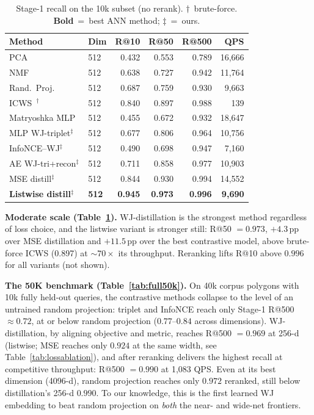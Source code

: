 \documentclass[sigconf]{acmart}
\begin{document}
\begin{table}[t]\centering
\caption{Stage-1 recall on the 10k subset (no rerank). $\dagger$~brute-force.
\textbf{Bold}~=~best ANN method; $\ddagger$~=~ours.}
\label{tab:results}\setlength{\tabcolsep}{4pt}\small
\begin{tabular}{@{}llrrrr@{}}
\toprule
Method & Dim & R@10 & R@50 & R@500 & QPS \\
\midrule
PCA~\cite{jolliffe02}                   & 512  & 0.432 & 0.553 & 0.789 & 16{,}666 \\
NMF~\cite{nmf99}                        & 512  & 0.638 & 0.727 & 0.942 & 11{,}764 \\
Rand.\ Proj.~\cite{achlioptas03}        & 512  & 0.687 & 0.759 & 0.930 &  9{,}663 \\
ICWS~\cite{ioffe10}$^\dagger$           & 512  & 0.840 & 0.897 & 0.988 &     139 \\
Matryoshka MLP~\cite{matryoshka22}      & 512  & 0.455 & 0.672 & 0.932 & 18{,}647 \\
\addlinespace[2pt]
MLP WJ-triplet$^\ddagger$               & 512  & 0.677 & 0.806 & 0.964 & 10{,}756 \\
InfoNCE--WJ$^\ddagger$                  & 512  & 0.490 & 0.698 & 0.947 &  7{,}160 \\
AE WJ-tri+recon$^\ddagger$              & 512  & 0.711 & 0.858 & 0.977 & 10{,}903 \\
MSE distill$^\ddagger$        & 512  & 0.844 & 0.930 & 0.994 & 14{,}552 \\
\textbf{Listwise distill}$^\ddagger$ & \textbf{512} & \textbf{0.945} & \textbf{0.973} & \textbf{0.996} & \textbf{9{,}690} \\
\bottomrule
\end{tabular}
\end{table}

\textbf{Moderate scale (Table~\ref{tab:results}).}
WJ-distillation is the strongest method regardless of loss choice, and the listwise
variant is stronger still: R@50 $=0.973$, $+4.3$\,pp over MSE distillation and
$+11.5$\,pp over the best contrastive model, above brute-force ICWS (0.897) at
${\sim}70\times$ its throughput. Reranking lifts R@10 above $0.996$ for all
variants (not shown).

\textbf{The 50K benchmark (Table~\ref{tab:full50k}).}
On 40k corpus polygons with 10k fully held-out queries, the contrastive methods
collapse to the level of an untrained random projection: triplet and InfoNCE reach
only Stage-1 R@500 $\approx 0.72$, at or below random projection ($0.77$--$0.84$
across dimensions). WJ-distillation, by aligning objective and metric, reaches
R@500 $=0.969$ at 256-d (listwise; MSE reaches only $0.924$ at the same width, see
Table~\ref{tab:lossablation}), and after reranking delivers the highest recall at
competitive throughput: R@500 $=0.990$ at 1{,}083 QPS. Even at its best dimension
(4096-d), random projection reaches only $0.972$ reranked, still below
distillation's 256-d $0.990$. To our knowledge,
this is the first learned WJ embedding to beat random projection on \emph{both} the
near- and wide-net frontiers.
\end{document}
